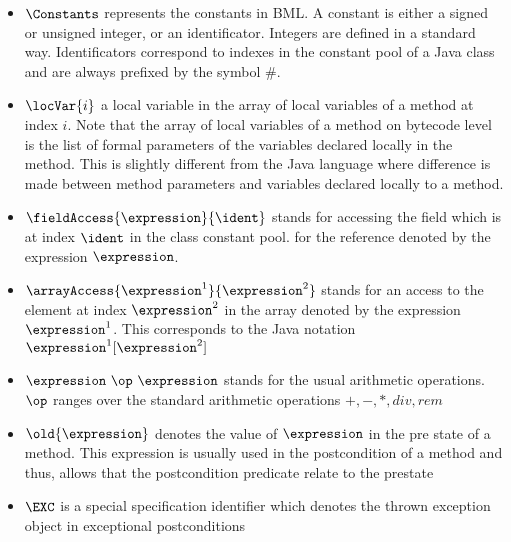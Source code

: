 \begin{itemize}
      \item  $ \Constants$ represents the constants in BML. 
             A constant is either a signed or unsigned integer, or an identificator.  
             Integers are defined in a standard way. Identificators correspond 
	     to indexes in the constant pool of a Java class and are always prefixed by the symbol $\#$. 
      
      \item  $ \locVar{i}$ a local variable in the array of local variables of a method at index $i$. Note that the array of local variables of a method on bytecode level
             is the list of formal parameters of the variables declared locally in the method.
             This is slightly different from the Java language where difference is made between method parameters and variables declared locally to a method.	     
     
      \item  $\fieldAccess{ \expression}{\ident}$ stands for accessing the field which is at index $ \ident $  in the class constant pool.
             for the reference denoted by the expression
             $ \expression $. 
	     
	    

      \item  $\arrayAccess{\expression^1} {\expression^2} $ stands for an access to the element at index $ \expression^2$ 
             in the array denoted by the expression $ \expression^1$. This corresponds to the Java notation $\expression^1[\expression^2 ]  $ 

  

      \item  $\expression \ \op \ \expression$ stands for the usual arithmetic operations.
             $\op$ ranges over the standard  arithmetic operations $ + , - , * , div ,  rem $ 

   
      \item $\old{\expression}$  denotes the value of $\expression$ in the pre state of a method. This expression is usually used in the postcondition of a
            method and thus, allows that the postcondition predicate relate to the prestate

      \item $\EXC$ is a special specification identifier which denotes the thrown exception object in exceptional postconditions
 \end{itemize}

